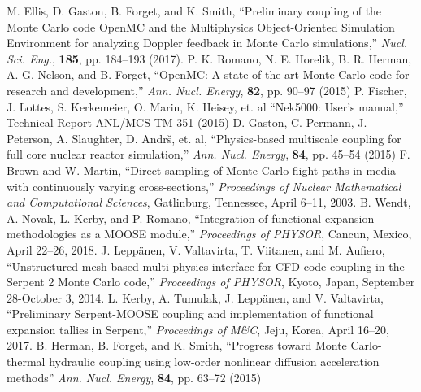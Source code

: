 \documentclass[letterpaper]{physor2018}
\begin{document}
\begin{thebibliography}{300}
 M. Ellis, D. Gaston, B. Forget, and K. Smith,
``Preliminary coupling of the Monte Carlo code OpenMC and the Multiphysics
Object-Oriented Simulation Environment for analyzing Doppler feedback in
Monte Carlo simulations,''
\emph{Nucl. Sci. Eng.}, \textbf{185}, pp. 184--193 (2017).
 P. K. Romano, N. E. Horelik, B. R. Herman, A. G. Nelson, and B. Forget,
``OpenMC: A state-of-the-art Monte Carlo code for research and development,''
\emph{Ann. Nucl. Energy}, \textbf{82}, pp. 90--97 (2015)
 P. Fischer, J. Lottes, S. Kerkemeier, O. Marin, K. Heisey, et. al
``Nek5000: User's manual,''
Technical Report ANL/MCS-TM-351 (2015)
 D. Gaston, C. Permann, J. Peterson, A. Slaughter, D. Andr\v{s}, et. al,
``Physics-based multiscale coupling for full core nuclear reactor simulation,''
\emph{Ann. Nucl. Energy}, \textbf{84}, pp. 45--54 (2015)
 F. Brown and W. Martin,
``Direct sampling of Monte Carlo flight paths in media with continuously
varying cross-sections,''
\emph{Proceedings of Nuclear Mathematical and Computational Sciences},
Gatlinburg, Tennessee, April 6--11, 2003.
 B. Wendt, A. Novak, L. Kerby, and P. Romano, ``Integration of
  functional expansion methodologies as a MOOSE module,'' \emph{Proceedings of
    PHYSOR}, Cancun, Mexico, April 22--26, 2018.
 J. Lepp{\"a}nen, V. Valtavirta, T. Viitanen, and M. Aufiero,
``Unstructured mesh based multi-physics interface for CFD code coupling
in the Serpent 2 Monte Carlo code,''
\emph{Proceedings of PHYSOR}, Kyoto, Japan, September 28-October 3, 2014.
 L. Kerby, A. Tumulak, J. Lepp{\"a}nen, and V. Valtavirta,
``Preliminary Serpent-MOOSE coupling and implementation of functional
expansion tallies in Serpent,''
\emph{Proceedings of M\&C},
Jeju, Korea, April 16--20, 2017.
 B. Herman, B. Forget, and K. Smith,
``Progress toward Monte Carlo-thermal hydraulic coupling using
low-order nonlinear diffusion acceleration methods''
\emph{Ann. Nucl. Energy}, \textbf{84}, pp. 63--72 (2015)
\end{thebibliography}
\end{document}
